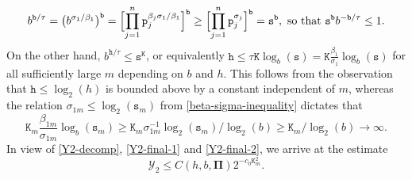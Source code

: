 \documentclass[12pt, twoside]{article}
\theoremstyle{definition}
\numberwithin{equation}{section}
\begin{document}
\[
b^{\mathtt b/\tau} = \bigl(b^{\sigma_1/\beta_1} \bigr)^{\mathtt b} = \Bigl[ \prod_{j=1}^{n} \mathtt p_j^{\beta_j \sigma_1/\beta_1}\Bigr]^{\mathtt b}  \geq  \Bigl[ \prod_{j=1}^{n} \mathtt p_j^{\sigma_j} \Bigr]^{\mathtt b} = \mathtt s^{\mathtt b}, \text{ so that } \mathtt s^{\mathtt b} b^{-\mathtt b/\tau} \leq 1. \]
On the other hand, $b^{\mathtt h/\tau} \leq \mathtt s^{\mathtt K}$, or equivalently $\mathtt h \leq \tau \mathtt K \log_{b}(\mathtt s) = \mathtt K \frac{\beta_1}{\sigma_1} \log_b(\mathtt s)$ for all sufficiently large $m$ depending on $b$ and $h$. This follows from the observation that $\mathtt h \leq \log_2(h)$ is bounded above by a constant independent of $m$, whereas the relation $\sigma_{1m} \leq \log_2(\mathtt s_m)$ from \eqref{beta-sigma-inequality} dictates that 
\[ \mathtt K_m \frac{\beta_{1m}}{\sigma_{1m}} \log_{b}(\mathtt s_m) \geq \mathtt K_m \sigma_{1m}^{-1} \log_{2}(\mathtt s_m)/\log_{2}(b) \geq \mathtt K_m/\log_2(b) \rightarrow \infty. \] 
In view of \eqref{Y2-decomp}, \eqref{Y2-final-1} and \eqref{Y2-final-2}, we arrive at the estimate 
\begin{equation} \label{Y2-final} 
\mathcal Y_2 \leq C(h, b, \pmb{\Pi}) 2^{-c_0 \mathtt K_m^2}.
\end{equation} 
\end{document}
